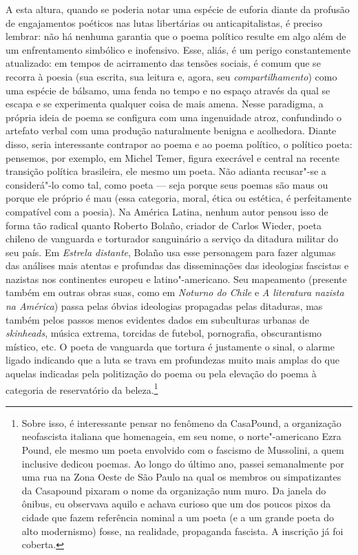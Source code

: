 \asterisc

A esta altura, quando se poderia notar uma espécie de euforia diante da
profusão de engajamentos poéticos nas lutas libertárias ou
anticapitalistas, é preciso lembrar: não há nenhuma garantia que o poema
político resulte em algo além de um enfrentamento simbólico e
inofensivo. Esse, aliás, é um perigo constantemente atualizado: em
tempos de acirramento das tensões sociais, é comum que se recorra à
poesia (sua escrita, sua leitura e, agora, seu \emph{compartilhamento})
como uma espécie de bálsamo, uma fenda no tempo e no espaço através da
qual se escapa e se experimenta qualquer coisa de mais amena. Nesse
paradigma, a própria ideia de poema se configura com uma ingenuidade
atroz, confundindo o artefato verbal com uma produção naturalmente
benigna e acolhedora. Diante disso, seria interessante contrapor ao
poema e ao poema político, o político poeta: pensemos, por exemplo, em
Michel Temer, figura execrável e central na recente transição política
brasileira, ele mesmo um poeta. Não adianta recusar"-se a considerá"-lo
como tal, como poeta --- seja porque seus poemas são maus ou porque ele
próprio é mau (essa categoria, moral, ética ou estética, é perfeitamente
compatível com a poesia). Na América Latina, nenhum autor pensou isso de
forma tão radical quanto Roberto Bolaño, criador de Carlos Wieder, poeta
chileno de vanguarda e torturador sanguinário a serviço da ditadura
militar do seu país. Em \emph{Estrela distante}, Bolaño usa esse
personagem para fazer algumas das análises mais atentas e profundas das
disseminações das ideologias fascistas e nazistas nos continentes
europeu e latino"-americano. Seu mapeamento (presente também em outras
obras suas, como em \emph{Noturno do Chile} e \emph{A literatura nazista
na América}) passa pelas óbvias ideologias propagadas pelas ditaduras,
mas também pelos passos menos evidentes dados em subculturas urbanas de
\emph{skinheads}, música extrema, torcidas de futebol, pornografia,
obscurantismo místico, etc. O poeta de vanguarda que tortura é justamente
o sinal, o alarme ligado indicando que a luta se trava em profundezas
muito mais amplas do que aquelas indicadas pela politização do poema ou
pela elevação do poema à categoria de reservatório da beleza.\footnote{Sobre
  isso, é interessante pensar no fenômeno da CasaPound, a organização
  neofascista italiana que homenageia, em seu nome, o norte"-americano
  Ezra Pound, ele mesmo um poeta envolvido com o fascismo de Mussolini,
  a quem inclusive dedicou poemas. Ao longo do último ano, passei
  semanalmente por uma rua na Zona Oeste de São Paulo na qual os membros
  ou simpatizantes da Casapound pixaram o nome da organização num muro.
  Da janela do ônibus, eu observava aquilo e achava curioso que um dos
  poucos pixos da cidade que fazem referência nominal a um poeta (e a um
  grande poeta do alto modernismo) fosse, na realidade, propaganda
  fascista. A inscrição já foi coberta.}

